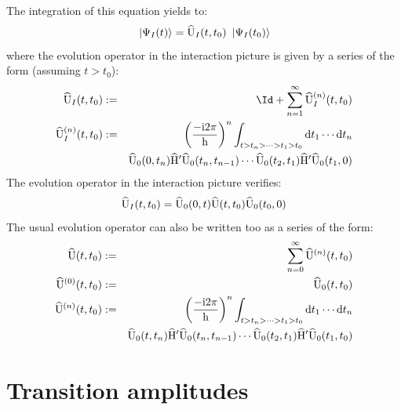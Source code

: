 \documentclass[10pt,a4paper,twoside,openany]{book}
\begin{document}
The integration of this equation yields to:
\begin{equation*}
\ \left|{\Psi_I(t)}\right\rangle = \widehat{\mathrm U}_I({t},{t_0}) \ \left|{\Psi_I({t_0})}\right\rangle \\
\end{equation*}
where the evolution operator in the interaction picture is given by a series of the form (assuming $t > t_0$):
\begin{eqnarray*}
\UopI t {t_0} & \eqdef & \Id + \sum_{n=1}^\infty \UopIn n t {t_0} \\
\UopIn n t {t_0} & \eqdef & \left( \frac{-\i 2 \pi} \h \right)^n \int_{t > t_n > \dotsb > t_1 > t_0} \dt_1 \dotsm \dt_n \\
&& \UopK 0 {t_n} \Hop' \UopK {t_n} {t_{n-1}} \dotsm \UopK {t_2} {t_1} \Hop' \UopK {t_1} 0
\end{eqnarray*}
The evolution operator in the interaction picture verifies:
\begin{equation*}
\widehat{\mathrm U}_I({t},{t_0}) = \widehat{\mathrm U}_0({0},{t}) \widehat{\mathrm U}({t},{t_0}) \widehat{\mathrm U}_0({t_0},{0})
\end{equation*}
The usual evolution operator can also be written too as a series of the form:
\begin{eqnarray*}
\widehat{\mathrm U}({t},{t_0}) & := & \sum_{n=0}^\infty \widehat{\mathrm U}^{({n})}({t},{t_0}) \\
\widehat{\mathrm U}^{({0})}({t},{t_0}) & := & \widehat{\mathrm U}_0({t},{t_0}) \\
\widehat{\mathrm U}^{({n})}({t},{t_0}) & := & \left( \frac{-\mathrm{i} 2 \pi} {\mathrm h} \right)^n \int_{t > t_n > \dotsb > t_1 > t_0} \mathrm dt_1 \dotsm \mathrm dt_n \\
&& \widehat{\mathrm U}_0({t},{t_n}) \widehat{\mathrm H}' \widehat{\mathrm U}_0({t_n},{t_{n-1}}) \dotsm \widehat{\mathrm U}_0({t_2},{t_1}) \widehat{\mathrm H}' \widehat{\mathrm U}_0({t_1},{t_0})
\end{eqnarray*}

\section{Transition amplitudes}
\end{document}
